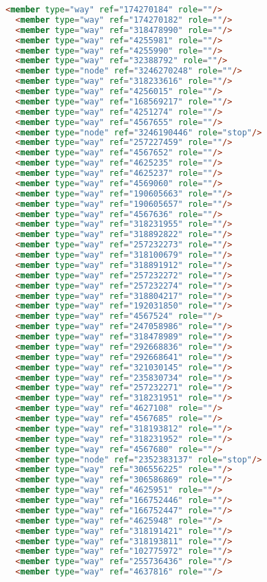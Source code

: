 \begin{lstlisting}[language=HTML,basicstyle=\tiny,caption=bandung1.xml]
  <member type="way" ref="174270184" role=""/>
  <member type="way" ref="174270182" role=""/>
  <member type="way" ref="318478990" role=""/>
  <member type="way" ref="4255981" role=""/>
  <member type="way" ref="4255990" role=""/>
  <member type="way" ref="32388792" role=""/>
  <member type="node" ref="3246270248" role=""/>
  <member type="way" ref="318233616" role=""/>
  <member type="way" ref="4256015" role=""/>
  <member type="way" ref="168569217" role=""/>
  <member type="way" ref="4251274" role=""/>
  <member type="way" ref="4567655" role=""/>
  <member type="node" ref="3246190446" role="stop"/>
  <member type="way" ref="257227459" role=""/>
  <member type="way" ref="4567652" role=""/>
  <member type="way" ref="4625235" role=""/>
  <member type="way" ref="4625237" role=""/>
  <member type="way" ref="4569060" role=""/>
  <member type="way" ref="190605663" role=""/>
  <member type="way" ref="190605657" role=""/>
  <member type="way" ref="4567636" role=""/>
  <member type="way" ref="318231955" role=""/>
  <member type="way" ref="318892822" role=""/>
  <member type="way" ref="257232273" role=""/>
  <member type="way" ref="318100679" role=""/>
  <member type="way" ref="318891912" role=""/>
  <member type="way" ref="257232272" role=""/>
  <member type="way" ref="257232274" role=""/>
  <member type="way" ref="318804217" role=""/>
  <member type="way" ref="192031850" role=""/>
  <member type="way" ref="4567524" role=""/>
  <member type="way" ref="247058986" role=""/>
  <member type="way" ref="318478989" role=""/>
  <member type="way" ref="292668836" role=""/>
  <member type="way" ref="292668641" role=""/>
  <member type="way" ref="321030145" role=""/>
  <member type="way" ref="235830734" role=""/>
  <member type="way" ref="257232271" role=""/>
  <member type="way" ref="318231951" role=""/>
  <member type="way" ref="4627108" role=""/>
  <member type="way" ref="4567685" role=""/>
  <member type="way" ref="318193812" role=""/>
  <member type="way" ref="318231952" role=""/>
  <member type="way" ref="4567680" role=""/>
  <member type="node" ref="2352383137" role="stop"/>
  <member type="way" ref="306556225" role=""/>
  <member type="way" ref="306586869" role=""/>
  <member type="way" ref="4625951" role=""/>
  <member type="way" ref="166752446" role=""/>
  <member type="way" ref="166752447" role=""/>
  <member type="way" ref="4625948" role=""/>
  <member type="way" ref="318191421" role=""/>
  <member type="way" ref="318193811" role=""/>
  <member type="way" ref="102775972" role=""/>
  <member type="way" ref="255736436" role=""/>
  <member type="way" ref="4637816" role=""/>

\end{lstlisting}
